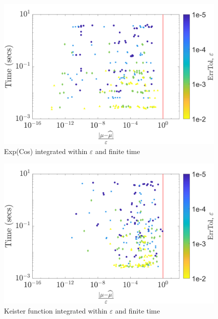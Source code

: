 \documentclass[twocolumn]{svjour3}          %
\begin{document}
\begin{figure}
	\centering
	\includegraphics[width=0.95\linewidth]{"figures/Exp(cos) guaranteed time 19-Jul-2018 08-14-22"}
	\caption[Guaranteed:]{Exp(Cos) integrated within $\varepsilon$ and finite time}
	\label{fig:expcos-guaranteed-time}
\end{figure}
\begin{figure}
	\centering
	\includegraphics[width=0.95\linewidth]{"figures/Keister guaranteed time 20-Jul-2018 20-54-43"}
	\caption[Guaranteed:]{Keister function integrated within $\varepsilon$ and finite time}
	\label{fig:keister-guaranteed-time}
\end{figure}
\end{document}

